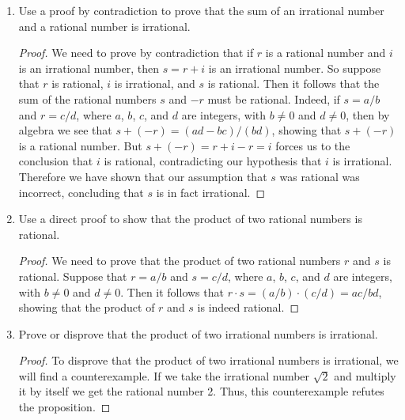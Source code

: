 \documentclass[11pt]{article}
\begin{document}
\begin{enumerate}[label=\textbf{\arabic*.}]
	\begin{proof}
		We need to prove that for some perfect square $n$, $n + 2$ is not a perfect square. Suppose that $n$ and, for the sake of contradiction, $n + 2$ are both perfect squares. Then $n = a^2$ and $n + 2 = b^2$ where $a$ and $b$ are non-negative integers. Taking the difference of $b^2 - a^2$ we get $(b + a)(b -a) = b^2 - a^2 = (n + 2) - n = 2$, which is impossible since if either $b - a$ or $b + a$ is equal to 1, the other cannot also equal 2.
	\end{proof}

	\pagebreak
	\item Use a proof by contradiction to prove that the sum of an irrational number and a rational number is irrational.
	
	\begin{proof}
		We need to prove by contradiction that if $r$ is a rational number and $i$ is an irrational number, then $s = r + i$ is an irrational number. So suppose that $r$ is rational, $i$ is irrational, and $s$ is rational. Then it follows that the sum of the rational numbers $s$ and $-r$ must be rational. Indeed, if $s = a/b$ and $r = c/d$, where $a$, $b$, $c$, and $d$ are integers, with $b \ne 0$ and $d \ne 0$, then by algebra we see that $s + (-r) = (ad - bc)/(bd)$, showing that $s + (-r)$ is a rational number. But $s + (-r) = r + i - r = i$ forces us to the conclusion that $i$ is rational, contradicting our hypothesis that $i$ is irrational. Therefore we have shown that our assumption that $s$ was rational was incorrect, concluding that $s$ is in fact irrational.
	\end{proof}

	\item Use a direct proof to show that the product of two rational numbers is rational.
	
	\begin{proof}
		We need to prove that the product of two rational numbers $r$ and $s$ is rational. Suppose that $r = a/b$ and $s = c/d$, where $a$, $b$, $c$, and $d$ are integers, with $b \ne 0$ and $d \ne 0$. Then it follows that $r \cdot s = (a/b) \cdot (c/d) = ac/bd$, showing that the product of $r$ and $s$ is indeed rational.
	\end{proof}

	\item Prove or disprove that the product of two irrational numbers is irrational.
	
	\begin{proof}
		To disprove that the product of two irrational numbers is irrational, we will find a counterexample. If we take the irrational number $\sqrt{2}$ and multiply it by itself we get the rational number 2. Thus, this counterexample refutes the proposition.
	\end{proof}


\end{enumerate}
\end{document}
